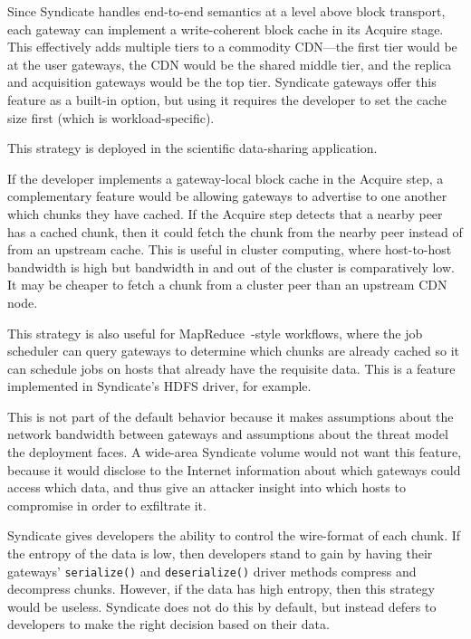 \hfill \break
{}
\hfill \break

Since Syndicate handles end-to-end semantics at a level above block transport,
each gateway can implement a write-coherent block cache in its Acquire stage. 
This effectively adds multiple tiers to a commodity CDN---the first tier would be at the user
gateways, the CDN would be the shared middle tier, and the replica and acquisition
gateways would be the top tier.  Syndicate gateways offer this feature as a
built-in option, but using it requires the developer to set the cache size first
(which is workload-specific).

This strategy is deployed in the scientific data-sharing application.

\hfill \break
{}
\hfill \break

If the developer implements a gateway-local block cache in the Acquire step, a
complementary feature would be allowing gateways to advertise to one another
which chunks they have cached.  If the Acquire step detects that a nearby peer
has a cached chunk, then it could fetch the chunk from the nearby peer instead
of from an upstream cache.  This is useful in cluster computing, where
host-to-host bandwidth is high but bandwidth in and out of the cluster is
comparatively low.  It may be cheaper to fetch a chunk from a cluster peer than
an upstream CDN node.

This strategy is also useful for MapReduce~\cite{mapreduce}-style
workflows, where the job scheduler can query gateways to determine
which chunks are already cached so it can schedule jobs on hosts that already
have the requisite data.  This is a feature implemented in Syndicate's HDFS driver, for
example.

This is not part of the default behavior because it makes assumptions about the
network bandwidth between gateways and assumptions about the threat model the
deployment faces.  A wide-area Syndicate volume would not want this feature,
because it would disclose to the Internet information about which gateways could
access which data, and thus give an attacker insight into which hosts
to compromise in order to exfiltrate it.

\hfill \break
{}
\hfill \break

Syndicate gives developers the ability to control the wire-format of each chunk.
If the entropy of the data is low, then developers stand to gain by having their
gateways' \texttt{serialize()} and \texttt{deserialize()} driver methods
compress and decompress chunks.  However, if the data has high entropy, then
this strategy would be useless.  Syndicate does not do this by default, but
instead defers to developers to make the right decision based on their data.

